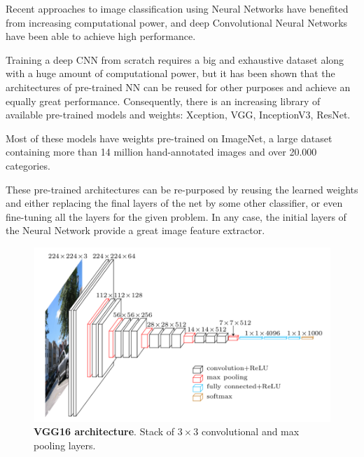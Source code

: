 Recent approaches to image classification using Neural Networks have benefited from increasing computational power, and deep Convolutional Neural Networks have been able to achieve high performance. 

Training a deep CNN from scratch requires a big and exhaustive dataset along with a huge amount of computational power, but it has been shown that the architectures of pre-trained NN can be reused for other purposes and achieve an equally great performance. Consequently, there is an increasing library of available pre-trained models and weights: Xception, VGG, InceptionV3, ResNet.

Most of these models have weights pre-trained on ImageNet, a large dataset containing more than 14 million hand-annotated images and over 20.000 categories.

These pre-trained architectures can be re-purposed by reusing the learned weights and either replacing the final layers of the net by some other classifier, or even fine-tuning all the layers for the given problem. In any case, the initial layers of the Neural Network provide a great image feature extractor.

\begin{figure}[h!]
	\centering
	\captionsetup{width=1\linewidth}
	\includegraphics[width=1\textwidth]{Figures/imagenet_vgg16.png}
	\caption{\textbf{VGG16 architecture}. Stack of $3\times 3$ convolutional and max pooling layers.}
	\label{fig:degrade}
\end{figure}

